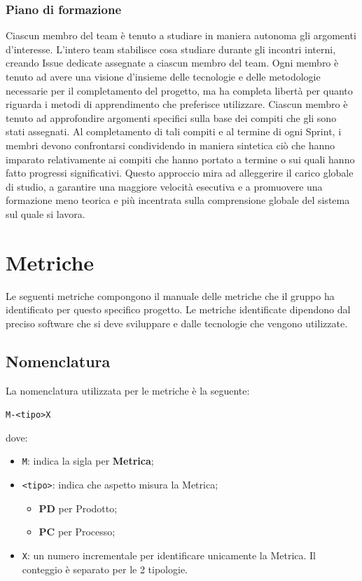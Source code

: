 \documentclass[a4paper,12pt]{article}
\begin{document}
\subsubsection{Piano di formazione}
Ciascun membro del team è tenuto a studiare in maniera autonoma gli argomenti d'interesse. L'intero team stabilisce cosa studiare durante gli incontri interni, creando Issue dedicate assegnate a ciascun membro del team. Ogni membro è tenuto ad avere una visione d'insieme delle tecnologie e delle metodologie necessarie per il completamento del progetto, ma ha completa libertà per quanto riguarda i metodi di apprendimento che preferisce utilizzare. Ciascun membro è tenuto ad approfondire argomenti specifici sulla base dei compiti che gli sono stati assegnati. Al completamento di tali compiti e al termine di ogni Sprint, i membri devono confrontarsi condividendo in maniera sintetica ciò che hanno imparato relativamente ai compiti che hanno portato a termine o sui quali hanno fatto progressi significativi. Questo approccio mira ad alleggerire il carico globale di studio, a garantire una maggiore velocità esecutiva e a promuovere una formazione meno teorica e più incentrata sulla comprensione globale del sistema sul quale si lavora. 

\section{Metriche} \label{sec:elenco-metriche}
Le seguenti metriche compongono il manuale delle metriche che il gruppo ha identificato per questo specifico progetto. Le metriche identificate dipendono dal preciso software che si deve sviluppare e dalle tecnologie che vengono utilizzate.

\subsection{Nomenclatura}
La nomenclatura utilizzata per le metriche è la seguente:
\begin{center}
    \texttt{M-<tipo>X}
\end{center}
dove:
\begin{itemize}
    \item \texttt{M}: indica la sigla per \textbf{Metrica};
    \item \texttt{<tipo>}: indica che aspetto misura la Metrica;
    \begin{itemize}
        \item \textbf{PD} per Prodotto;
        \item \textbf{PC} per Processo;
    \end{itemize}
    \item \texttt{X}: un numero incrementale per identificare unicamente la Metrica. Il conteggio è separato per le 2 tipologie.
\end{itemize}
\end{document}

